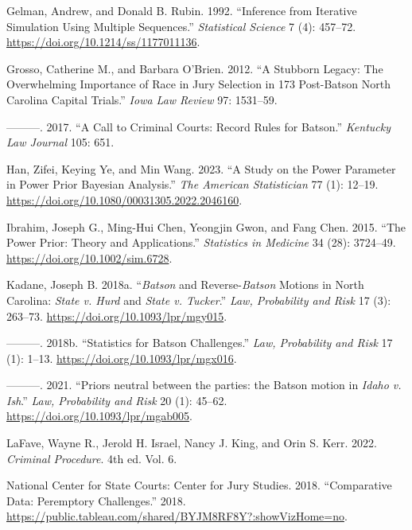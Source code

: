 \documentclass[12pt]{article}
\newlength{\cslhangindent}
\newlength{\cslentryspacingunit} %
\newenvironment{CSLReferences}[2] %
 {%
  \setlength{\parindent}{0pt}
  \ifodd #1
  \let\oldpar\par
  \def\par{\hangindent=\cslhangindent\oldpar}
  \fi
  \setlength{\parskip}{#2\cslentryspacingunit}
 }%
 {}
\begin{document}
\begin{CSLReferences}{1}{0}
\leavevmode{}%
Gelman, Andrew, and Donald B. Rubin. 1992. {``{Inference from Iterative Simulation Using Multiple Sequences}.''} \emph{Statistical Science} 7 (4): 457--72. \url{https://doi.org/10.1214/ss/1177011136}.

\leavevmode{}%
Grosso, Catherine M., and Barbara O'Brien. 2012. {``A Stubborn Legacy: The Overwhelming Importance of Race in Jury Selection in 173 Post-Batson North Carolina Capital Trials.''} \emph{Iowa Law Review} 97: 1531--59.

\leavevmode{}%
---------. 2017. {``A Call to Criminal Courts: Record Rules for Batson.''} \emph{Kentucky Law Journal} 105: 651.

\leavevmode{}%
Han, Zifei, Keying Ye, and Min Wang. 2023. {``A Study on the Power Parameter in Power Prior Bayesian Analysis.''} \emph{The American Statistician} 77 (1): 12--19. \url{https://doi.org/10.1080/00031305.2022.2046160}.

\leavevmode{}%
Ibrahim, Joseph G., Ming-Hui Chen, Yeongjin Gwon, and Fang Chen. 2015. {``The Power Prior: Theory and Applications.''} \emph{Statistics in Medicine} 34 (28): 3724--49. \url{https://doi.org/10.1002/sim.6728}.

\leavevmode{}%
Kadane, Joseph B. 2018a. {``\emph{Batson} and Reverse-\emph{Batson} Motions in North Carolina: \emph{State v. Hurd} and \emph{State v. Tucker}.''} \emph{Law, Probability and Risk} 17 (3): 263--73. \url{https://doi.org/10.1093/lpr/mgy015}.

\leavevmode{}%
---------. 2018b. {``Statistics for Batson Challenges.''} \emph{Law, Probability and Risk} 17 (1): 1--13. \url{https://doi.org/10.1093/lpr/mgx016}.

\leavevmode{}%
---------. 2021. {``{Priors neutral between the parties: the Batson motion in \emph{Idaho v. Ish}}.''} \emph{Law, Probability and Risk} 20 (1): 45--62. \url{https://doi.org/10.1093/lpr/mgab005}.

\leavevmode{}%
LaFave, Wayne R., Jerold H. Israel, Nancy J. King, and Orin S. Kerr. 2022. \emph{Criminal Procedure}. 4th ed. Vol. 6.

\leavevmode{}%
National Center for State Courts: Center for Jury Studies. 2018. {``Comparative Data: Peremptory Challenges.''} 2018. \url{https://public.tableau.com/shared/BYJM8RF8Y?:showVizHome=no}.


\end{CSLReferences}
\end{document}
